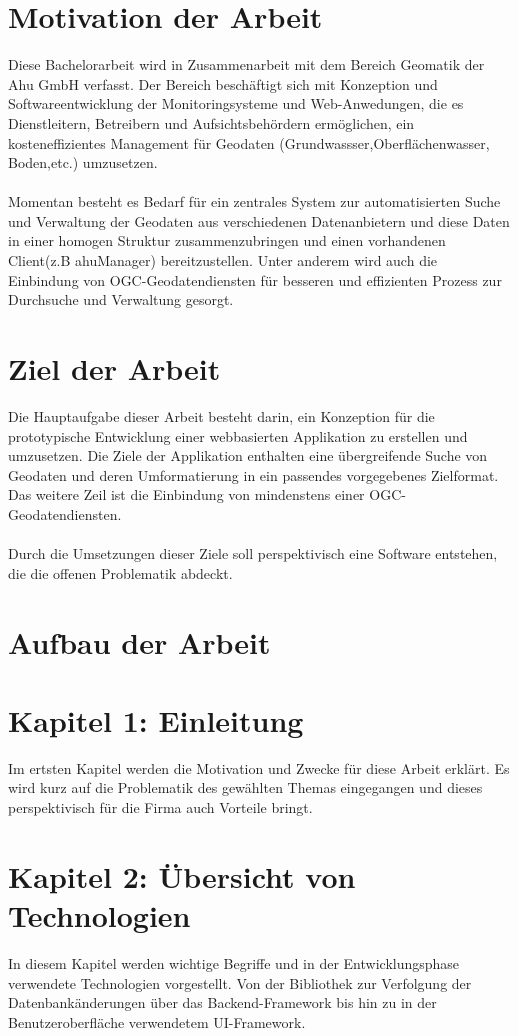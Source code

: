 \documentclass[a4paper,12pt]{scrreprt}
\begin{document}
\section{Motivation der Arbeit}
Diese Bachelorarbeit wird in Zusammenarbeit mit dem Bereich Geomatik der Ahu GmbH verfasst. Der Bereich beschäftigt sich mit Konzeption und Softwareentwicklung der Monitoringsysteme und Web-Anwedungen, die es Dienstleitern, Betreibern und Aufsichtsbehördern ermöglichen, ein kosteneffizientes Management für Geodaten (Grundwassser,Oberflächenwasser, Boden,etc.) umzusetzen. \\ \\
Momentan besteht es Bedarf für ein zentrales System zur automatisierten Suche und Verwaltung der Geodaten aus verschiedenen Datenanbietern und diese Daten in einer homogen Struktur zusammenzubringen und einen vorhandenen Client(z.B ahuManager) bereitzustellen. Unter anderem  wird auch die Einbindung von OGC-Geodatendiensten für besseren und effizienten Prozess zur Durchsuche und Verwaltung gesorgt. 

\section{Ziel der Arbeit}
Die Hauptaufgabe dieser Arbeit besteht darin, ein Konzeption für die prototypische Entwicklung einer webbasierten Applikation zu erstellen und umzusetzen. Die Ziele der Applikation enthalten eine übergreifende Suche von Geodaten und deren Umformatierung in ein passendes vorgegebenes Zielformat. Das weitere Zeil ist die Einbindung von mindenstens einer OGC-Geodatendiensten.\\ \\ Durch die Umsetzungen dieser Ziele soll perspektivisch eine Software entstehen, die die offenen Problematik abdeckt.

\section{Aufbau der Arbeit}
\section*{\small \textbf{Kapitel 1: Einleitung}}
Im ertsten Kapitel werden die Motivation und Zwecke für diese Arbeit erklärt. Es wird kurz auf die Problematik des gewählten Themas eingegangen und dieses perspektivisch für die Firma auch Vorteile bringt.

\section*{\small \textbf{Kapitel 2: Übersicht von Technologien}}
In diesem Kapitel werden wichtige Begriffe und in der Entwicklungsphase verwendete Technologien vorgestellt. Von der Bibliothek zur Verfolgung der Datenbankänderungen über das Backend-Framework bis hin zu in der Benutzeroberfläche verwendetem UI-Framework.   
\end{document}
